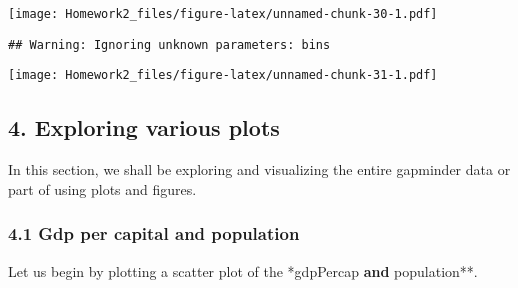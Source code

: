 \documentclass[]{article}
\newenvironment{Shaded}{\begin{snugshade}}{\end{snugshade}}
\newcommand{\KeywordTok}[1]{\textcolor[rgb]{0.13,0.29,0.53}{\textbf{{#1}}}}
\newcommand{\DataTypeTok}[1]{\textcolor[rgb]{0.13,0.29,0.53}{{#1}}}
\newcommand{\DecValTok}[1]{\textcolor[rgb]{0.00,0.00,0.81}{{#1}}}
\newcommand{\StringTok}[1]{\textcolor[rgb]{0.31,0.60,0.02}{{#1}}}
\newcommand{\CommentTok}[1]{\textcolor[rgb]{0.56,0.35,0.01}{\textit{{#1}}}}
\newcommand{\NormalTok}[1]{{#1}}
\begin{document}
\texttt{[image: Homework2\_files/figure-latex/unnamed-chunk-30-1.pdf]}

\begin{Shaded}
\end{Shaded}

\begin{verbatim}
## Warning: Ignoring unknown parameters: bins
\end{verbatim}

\texttt{[image: Homework2\_files/figure-latex/unnamed-chunk-31-1.pdf]}

\subsection{4. Exploring various plots}\label{exploring-various-plots}

In this section, we shall be exploring and visualizing the entire
gapminder data or part of using plots and figures.

\subsubsection{4.1 Gdp per capital and
population}\label{gdp-per-capital-and-population}

Let us begin by plotting a scatter plot of the *gdpPercap\textbf{ and
}population**.

\begin{Shaded}
\end{Shaded}
\end{document}
